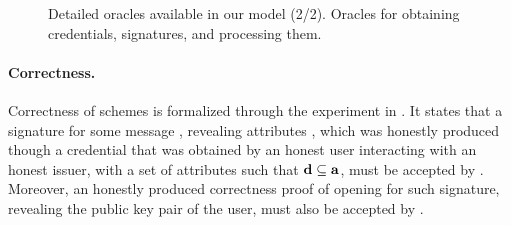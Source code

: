 {\begin{figure*}[htp!]
{\begin{minipage}[t]{.5\textwidth}
        
      \end{minipage}
      
    }

    \caption{Detailed oracles available in our model (2/2). Oracles for
      obtaining credentials, signatures, and processing them.}
    \label{fig:oracles}
  \end{figure*}
}

\paragraph{Correctness.} %
Correctness of \GSAC schemes is formalized through the experiment in
. It states that a signature for some message \msg,
revealing attributes \dattrs, which was honestly produced though a credential
that was obtained by an honest user interacting with an honest issuer, with a
set of attributes \attrs such that $\mathbf{d} \subseteq \mathbf{a}$, must be accepted
by \Verify. Moreover, an honestly produced correctness proof of opening for such
signature, revealing the public key pair of the user, must also be accepted by
\Judge.


